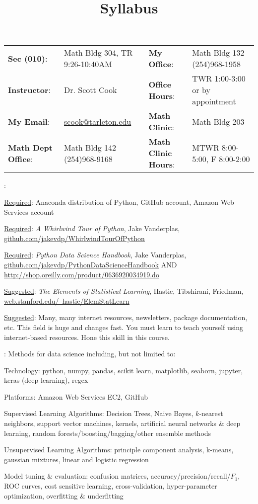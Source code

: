 \documentclass[letterpaper]{article}
\title{Syllabus}
\begin{document}
\begin{center}
\vspace{-16\lineskip}
\begin{tabular}{ll||ll}
\textbf{Sec (010)}: & Math Bldg 304, TR 9:26-10:40AM & \textbf{My Office}: & Math Bldg 132 (254)968-1958 \\
\textbf{Instructor}: & Dr. Scott Cook & \textbf{Office Hours}: & TWR 1:00-3:00 or by appointment \\
\textbf{My Email}: & \href{mailto:scook@tarleton.edu}{scook@tarleton.edu} & \textbf{Math Clinic}: & Math Bldg 203 \\
\textbf{Math Dept Office}: & Math Bldg 142 (254)968-9168 & \textbf{Math Clinic Hours}: & MTWR 8:00-5:00, F 8:00-2:00\\
\end{tabular}
\hhrule
\end{center}


\bu[Materials]: 
\bit
  \item \underline{Required}: Anaconda distribution of Python, GitHub account, Amazon Web Services account
  \item \underline{Required}: \textit{A Whirlwind Tour of Python}, Jake Vanderplas, \href{https://github.com/jakevdp/WhirlwindTourOfPython}{\underline{github.com/jakevdp/WhirlwindTourOfPython}}
  \item \underline{Required}: \textit{Python Data Science Handbook}, Jake Vanderplas, \href{https://github.com/jakevdp/PythonDataScienceHandbook}{\underline{github.com/jakevdp/PythonDataScienceHandbook}} AND \href{http://shop.oreilly.com/product/0636920034919.do}{\underline{http://shop.oreilly.com/product/0636920034919.do}}
  \item \underline{Suggested}: \textit{The Elements of Statistical Learning}, Hastie, Tibshirani, Friedman, \href{https://web.stanford.edu/~hastie/ElemStatLearn/}{\underline{web.stanford.edu/~hastie/ElemStatLearn}}
  \item \underline{Suggested}: Many, many internet resources, newsletters, package documentation, etc.  This field is huge and changes fast.  You must learn to teach yourself using internet-based resources.  Hone this skill in this course.
\eit
 
: Methods for data science including, but not limited to:
\bit
	\item Technology: python, numpy, pandas, scikit learn, matplotlib, seaborn, jupyter, keras (deep learning), regex
	\item Platforms: Amazon Web Services EC2, GitHub
	\item Supervised Learning Algorithms: Decision Trees, Naive Bayes, $k$-nearest neighbors, support vector machines, kernels, artificial neural networks \& deep learning, random forests/boosting/bagging/other ensemble methods
	\item Unsupervised Learning Algorithms: principle component analysis, k-means, gaussian mixtures, linear and logistic regression
	\item Model tuning \& evaluation: confusion matrices, accuracy/precision/recall/$F_1$, ROC curves, cost sensitive learning, cross-validation, hyper-parameter optimization, overfitting \& underfitting
\eit
	
\end{document}
